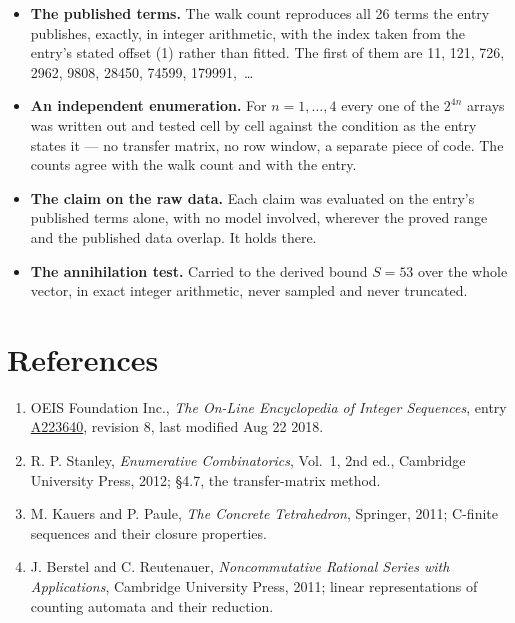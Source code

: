 \documentclass[11pt]{article}
\theoremstyle{definition}
\begin{document}
\begin{itemize}

\item {\bfseries The published terms.} The walk count reproduces all 26 terms the entry publishes, exactly, in integer arithmetic, with the index taken from the entry's stated offset (1) rather than fitted. The first of them are 11, 121, 726, 2962, 9808, 28450, 74599, 179991,~\dots

\item {\bfseries An independent enumeration.} For $n = 1,\dots,4$ every one of the $2^{4n}$ arrays was written out and tested cell by cell against the condition as the entry states it --- no transfer matrix, no row window, a separate piece of code. The counts agree with the walk count and with the entry.

\item {\bfseries The claim on the raw data.} Each claim was evaluated on the entry's published terms alone, with no model involved, wherever the proved range and the published data overlap. It holds there.

\item {\bfseries The annihilation test.} Carried to the derived bound $S = 53$ over the whole vector, in exact integer arithmetic, never sampled and never truncated.

\end{itemize}

\section{References}

\begin{enumerate}

\item OEIS Foundation Inc., \emph{The On-Line Encyclopedia of Integer Sequences}, entry \href{https://oeis.org/A223640}{A223640}, revision 8, last modified Aug 22 2018.

\item R. P. Stanley, \emph{Enumerative Combinatorics}, Vol.~1, 2nd ed., Cambridge University Press, 2012; \S4.7, the transfer-matrix method.

\item M. Kauers and P. Paule, \emph{The Concrete Tetrahedron}, Springer, 2011; C-finite sequences and their closure properties.

\item J. Berstel and C. Reutenauer, \emph{Noncommutative Rational Series with Applications}, Cambridge University Press, 2011; linear representations of counting automata and their reduction.

\end{enumerate}
\end{document}
